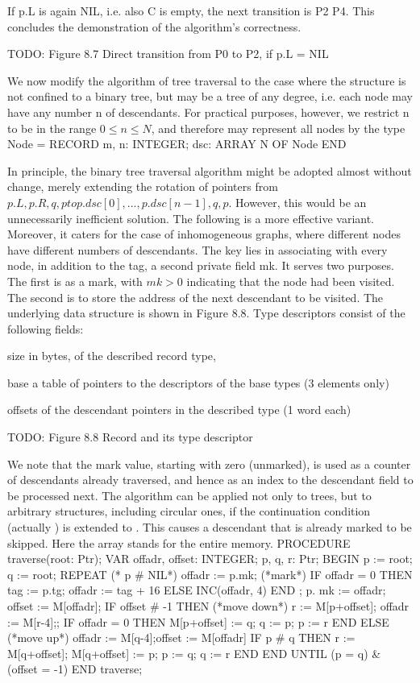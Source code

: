 If p.L is again NIL, i.e. also C is empty, the next transition is P2 \to P4. This concludes the demonstration of the algorithm's correctness.

TODO: Figure 8.7 Direct transition from P0 to P2, if p.L = NIL

We now modify the algorithm of tree traversal to the case where the structure is not confined to a binary tree, but may be a tree of any degree, i.e. each node may have any number n of descendants. For practical purposes, however, we restrict n to be in the range $0 \le n \le N$, and therefore may represent all nodes by the type
\begintt
Node = RECORD m, n: INTEGER; dsc: ARRAY N OF Node
END
\endtt

\noindent In principle, the binary tree traversal algorithm might be adopted almost without change, merely extending the rotation of pointers from $p.L, p.R, q, p to p.dsc[0], ... , p.dsc[n-1], q, p$. However, this would be an unnecessarily inefficient solution. The following is a more effective variant. Moreover, it caters for the case of inhomogeneous graphs, where different nodes have different numbers of descendants. The key lies in associating with every node, in addition to the tag, a second private field mk. It serves two purposes. The first is as a mark, with $mk > 0$ indicating that the node had been visited. The second is to store the address of the next descendant to be visited. The underlying data structure is shown in Figure 8.8. Type descriptors consist of the following fields:

size in bytes, of the described record type,

base a table of pointers to the descriptors of the base types (3 elements only)

offsets of the descendant pointers in the described type (1 word each)

TODO: Figure 8.8 Record and its type descriptor

We note that the mark value, starting with zero (unmarked), is used as a counter of descendants already traversed, and hence as an index to the descendant field to be processed next. The algorithm can be applied not only to trees, but to arbitrary structures, including circular ones, if the continuation condition  (actually ) is extended to . This causes a descendant that is already marked to be skipped. Here the array  stands for the entire memory.
\begintt
PROCEDURE traverse(root: Ptr);
VAR offadr, offset: INTEGER; p, q, r: Ptr;
BEGIN p := root; q := root;
REPEAT (* p # NIL*) offadr := p.mk; (*mark*)
IF offadr = 0 THEN tag := p.tg; offadr := tag + 16 ELSE INC(offadr, 4) END ; p. mk := offadr; offset := M[offadr];
IF offset # -1 THEN (*move down*)
r := M[p+offset]; offadr := M[r-4];;
IF offadr = 0 THEN M[p+offset] := q; q := p; p := r END ELSE (*move up*)
offadr := M[q-4];offset := M[offadr]
IF p # q THEN r := M[q+offset]; M[q+offset] := p; p := q; q := r END END
UNTIL (p = q) & (offset = -1) END traverse;
\endtt

